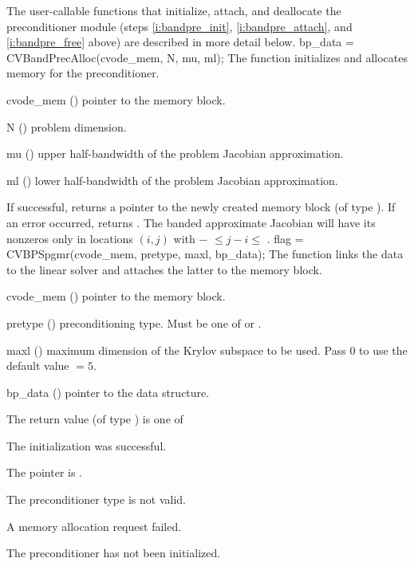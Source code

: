 The user-callable functions that initialize, attach, and deallocate
the {\cvbandpre} preconditioner module (steps \ref{i:bandpre_init},
\ref{i:bandpre_attach}, and \ref{i:bandpre_free} above) are described
in more detail below.
{
  bp\_data = CVBandPrecAlloc(cvode\_mem, N, mu, ml);
}
{
  The function  initializes and allocates
  memory for the {\cvbandpre} preconditioner.
}
{
  \begin{args}
  \item[cvode\_mem] ()
    pointer to the {\cvode} memory block.
  \item[N] ()
    problem dimension.
  \item[mu] ()
    upper half-bandwidth of the problem Jacobian approximation.
  \item[ml] ()
    lower half-bandwidth of the problem Jacobian approximation.
  \end{args}
}
{
  If successful,  returns a pointer to the newly created 
  {\cvbandpre} memory block (of type ).
  If an error occurred,  returns .
}
{
  The banded approximate Jacobian will have its nonzeros only in locations
  $(i,j)$ with $-$ $\leq j-i \leq$ .
}
{
  flag = CVBPSpgmr(cvode\_mem, pretype, maxl, bp\_data);
}
{
  The function  links the {\cvbandpre} data to the
  {\cvspgmr} linear solver and attaches the latter to the {\cvode}
  memory block.
}
{
  \begin{args}
  \item[cvode\_mem] ()
    pointer to the {\cvode} memory block.
  \item[pretype] ()
    preconditioning type. Must be one of  or .
  \item[maxl] ()
    maximum dimension of the Krylov subspace to be used. Pass $0$ to use the 
    default value  $= 5$.
  \item[bp\_data] ()
    pointer to the {\cvbandpre} data structure.
  \end{args}
}
{
  The return value  (of type ) is one of
  \begin{args}
  \item[\Id{CVSPILS\_SUCCESS}] 
    The {\cvspgmr} initialization was successful.
  \item[\Id{CVSPILS\_MEM\_NULL}]
    The  pointer is .
  \item[\Id{CVSPILS\_ILL\_INPUT}]
    The preconditioner type  is not valid.
  \item[\Id{CVSPILS\_MEM\_FAIL}]
    A memory allocation request failed.
  \item[\Id{CVBANDPRE\_PDATA\_NULL}]
    The {\cvbandpre} preconditioner has not been initialized.
  \end{args}
}
